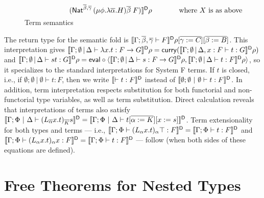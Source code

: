 \documentclass[runningheads]{llncs}
\begin{document}
\begin{figure}[t]
\begin{adjustbox}{varwidth=6in, max width=5.3in, fbox, center}
\[\begin{array}{lll}
\hspace*{0.79in}(\Nat^{{\ol{\beta},\ol{\gamma}} }\,(\mu
  \phi.\lambda \overline \alpha.H)\overline \beta\;F)
\rrbracket^{\mathsf{D}} \rho & & \hspace*{0.2in} \mbox{ where } X \mbox{ is as above
}\vspace*{-0.1in} 
\end{array}\]
\caption{Term semantics}\label{fig:term-sem} 
\vspace*{-0.05in}
\end{adjustbox}\vspace*{-0.1in}
\end{figure}


The return type for the semantic fold is
$\llbracket{\Gamma;\overline{\beta},\overline{\gamma} \vdash F}\rrbracket^{\mathsf D}\rho[\overline{\gamma :=
    C}][\overline{\beta := B}]$.  This interpretation gives
$\llbracket{\Gamma;\emptyset \,|\, \Delta \vdash \lambda x.t : F \to G}\rrbracket^{\mathsf D}\rho
= \mathsf{curry} (\llbracket{\Gamma;\emptyset \,|\, \Delta, x : F \vdash t :
  G}\rrbracket^{\mathsf D}\rho)$ and $\llbracket{\Gamma;\emptyset \,|\, \Delta \vdash st: G}\rrbracket^{\mathsf D} \rho
= \mathsf{eval} \circ \langle \llbracket{\Gamma;\emptyset \,|\, \Delta \vdash s: F
  \to G}\rrbracket^{\mathsf D}\rho, \llbracket{\Gamma;\emptyset \,|\, \Delta \vdash t: F}\rrbracket^{\mathsf D}\rho
\rangle$, so it specializes to the standard interpretations for System
F terms.  If $t$ is closed, i.e., if $\emptyset; \emptyset~|~\emptyset
\vdash t : F$, then we write $\llbracket{\vdash t : F}\rrbracket^{\mathsf D}$ instead of
$\llbracket{\emptyset; \emptyset~|~\emptyset \vdash t : F}\rrbracket^{\mathsf D}$.  In addition,
term interpretation respects substitution for both functorial and
non-functorial type variables, as well as term substitution.  Direct
calculation reveals that interpretations of terms also satisfy
$\llbracket{\Gamma; \Phi~|~\Delta \vdash
  (L_{\overline{\alpha}}x.t)_{\overline{K}}s}\rrbracket^{\mathsf D} = \llbracket{\Gamma;
  \Phi~|~\Delta \vdash t [\overline{\alpha := K}][x := s]}\rrbracket^{\mathsf D}$.
Term extensionality for both types and terms --- i.e.,
$\llbracket{\Gamma;\Phi\vdash (L_\alpha x.t)_\alpha \top : F}\rrbracket^{\mathsf D} =
\llbracket{\Gamma;\Phi \vdash t : F}\rrbracket^{\mathsf D}$ and
$\llbracket{\Gamma;\Phi\vdash (L_\alpha x.t)_\alpha x : F}\rrbracket^{\mathsf D} =
\llbracket{\Gamma;\Phi \vdash t : F}\rrbracket^{\mathsf D}$ --- follow (when both
sides of these equations are defined).

\vspace*{-0.15in}

\section{Free Theorems for Nested Types}\label{sec:ftnt}
\end{document}

